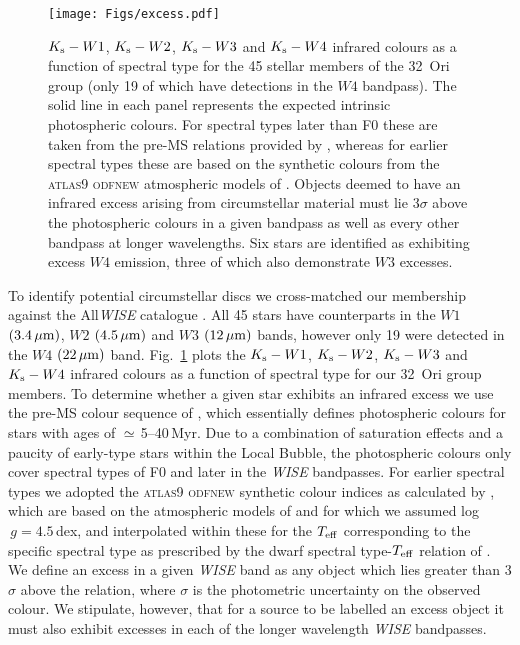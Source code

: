 \documentclass[usenatbib]{mnras}
\begin{document}
\begin{figure*}
\centering
\texttt{[image: Figs/excess.pdf]}
\caption[]{$K_{\rm{s}}-W1$, $K_{\rm{s}}-W2$, $K_{\rm{s}}-W3$ and
  $K_{\rm{s}}-W4$ infrared colours as a function of spectral type for
  the 45 stellar members of the 32~Ori group (only 19 of which have
  detections in the $W4$ bandpass). The solid line in each panel
  represents the expected intrinsic photospheric colours. For spectral types
  later than F0 these are taken from the pre-MS relations provided by \cite{Pecaut13},
  whereas for earlier spectral types these are based on the synthetic colours
  from the \textsc{atlas9 odfnew} atmospheric models of \cite{Castelli04}.
  Objects deemed to have an infrared excess arising
  from circumstellar material must lie 3$\sigma$ above the
  photospheric colours in a given bandpass as well as every other
  bandpass at longer wavelengths. Six stars are identified as exhibiting
  excess $W4$ emission, three of which also demonstrate $W3$ excesses.}
\label{fig:excess}
\end{figure*}

To identify potential circumstellar discs we cross-matched our
membership against the All\emph{WISE} catalogue \citep{Cutri14}. All
45 stars have counterparts in the $W1$ $(3.4\,\rm{\mu m})$, $W2$
$(4.5\,\rm{\mu m})$ and $W3$ $(12\,\rm{\mu m})$ bands, however only 19
were detected in the $W4$ $(22\,\rm{\mu m})$
band. Fig.~\ref{fig:excess} plots the $K_{\rm{s}}-W1$,
$K_{\rm{s}}-W2$, $K_{\rm{s}}-W3$ and $K_{\rm{s}}-W4$ infrared colours
as a function of spectral type for our 32~Ori group members. To
determine whether a given star exhibits an infrared excess we use the
pre-MS colour sequence of \cite{Pecaut13}, which essentially defines
photospheric colours for stars with ages of $\simeq$\,5--40\,Myr. Due to a
combination of saturation effects and a paucity of early-type stars within
the Local Bubble, the \citeauthor{Pecaut13} photospheric colours only cover
spectral types of F0 and later in the \emph{WISE} bandpasses. For earlier
spectral types we adopted the \textsc{atlas9} \textsc{odfnew} synthetic
colour indices as calculated by \citeauthor{Pecaut13}, which are based on
the atmospheric models of \cite{Castelli04} and for which we assumed
log$\,g=4.5$\,dex, and interpolated within these for the $T_{\rm{eff}}$
corresponding to the specific spectral type as prescribed by the dwarf
spectral type-$T_{\rm{eff}}$ relation of \citeauthor{Pecaut13}. We
define an excess in a given \emph{WISE} band as any object which lies
greater than 3$\sigma$ above the \citeauthor{Pecaut13} relation, where
$\sigma$ is the photometric uncertainty on the observed colour. We
stipulate, however, that for a source to be labelled an excess object
it must also exhibit excesses in each of the longer wavelength
\emph{WISE} bandpasses.
\end{document}
